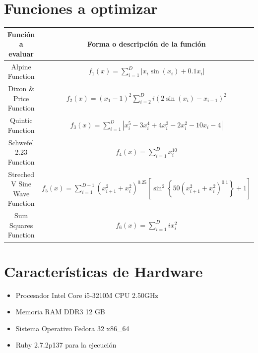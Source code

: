\documentclass[10pt]{article}
\begin{document}
\section{Funciones a optimizar}
\begin{center}
  \begin{tabular}{|c|c|}
    \hline
    Función a evaluar & Forma o descripción de la función\\
    \hline
    Alpine Function & \(\displaystyle f_{1}(x)=\sum_{i=1}^{D} \left|x_{i}\sin(x_{i})+0.1x_{i}\right|\) \\
    \hline
    Dixon \& Price Function & \(\displaystyle f_{2}(x)=(x_{1}-1)^{2}\sum_{i=2}^{D} i\left(2\sin(x_{i})-x_{i-1}\right)^{2}\)\\
    \hline
    Quintic Function & \(\displaystyle f_{3}(x)=\sum_{i=1}^{D} \left|x_{i}^{5}-3x_{i}^{4}+4x_{i}^3-2x_{i}^{2}-10x_{i}-4\right|\)\\
    \hline
    Schwefel 2.23 Function & \(\displaystyle f_{4}(x)=\sum_{i=1}^{D}x_{i}^{10}\)\\
    \hline
    Streched V Sine Wave Function & \(\displaystyle f_{5}(x)=\sum_{i=1}^{D-1}(x_{i+1}^{2}+x_{i}^{2})^{0.25}\left[\sin^{2}\left\{50(x_{i+1}^{2}+x_{i}^{2})^{0.1}\right\}+1\right]\)\\
    \hline
    Sum Squares Function & \(\displaystyle f_{6}(x)=\sum_{i=1}^{D}ix_{i}^{2}\)\\
    \hline
  \end{tabular}
\end{center}
\section{Características de Hardware}
\begin{itemize}
  \item Procesador Intel Core i5-3210M CPU 2.50GHz
  \item Memoria RAM DDR3 12 GB
  \item Sistema Operativo Fedora 32 x86\_64
  \item Ruby 2.7.2p137 para la ejecución
\end{itemize}
\end{document}
